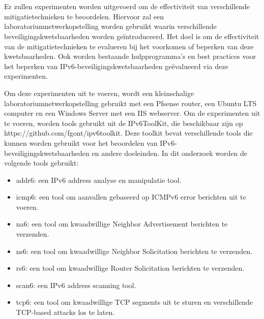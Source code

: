 
\chapter{}%
\label{ch:methodologie}






Er zullen experimenten worden uitgevoerd om de effectiviteit van verschillende mitigatietechnieken te beoordelen. Hiervoor zal een laboratoriumnetwerkopstelling worden gebruikt waarin verschillende beveiligingskwetsbaarheden worden geïntroduceerd. Het doel is om de effectiviteit van de mitigatietechnieken te evalueren bij het voorkomen of beperken van deze kwetsbaarheden. Ook worden bestaande hulpprogramma's en best practices voor het beperken van \newline IPv6-beveiligingskwetsbaarheden geëvalueerd via deze experimenten.

Om deze experimenten uit te voeren, wordt een kleinschalige laboratoriumnetwerkopstelling gebruikt met een Pfsense router, een Ubuntu LTS computer en een Windows Server met een IIS webserver. Om de experimenten uit te voeren, worden tools gebruikt uit de IPv6ToolKit, die beschikbaar zijn op \newline https://github.com/fgont/ipv6toolkit. Deze toolkit bevat verschillende tools die kunnen worden gebruikt voor het beoordelen van IPv6-beveiligingskwetsbaarheden en andere doeleinden. In dit onderzoek worden de volgende tools gebruikt:

\begin{itemize}
    \item	addr6: een IPv6 address analyse en manipulatie tool.
    \item	icmp6: een tool om aanvallen gebaseerd op ICMPv6 error berichten uit te voeren.
    \item	na6: een tool om kwaadwillige  Neighbor Advertisement berichten te verzenden.
    \item	ns6: een tool om kwaadwillige Neighbor Solicitation berichten te verzenden.
    \item	rs6: een tool om kwaadwillige Router Solicitation berichten te verzenden.
    \item	scan6: een IPv6 address scanning tool.
    \item	tcp6: een tool om kwaadwillige TCP segments uit te sturen en verschillende TCP-based attacks los te laten.
\end{itemize}

